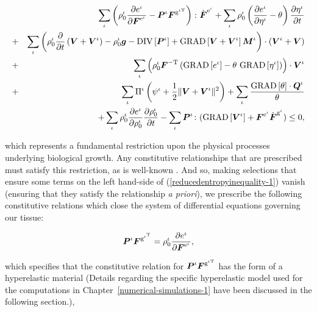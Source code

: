 \begin{eqnarray}
& &\sum\limits_{\iota}\left(\rho_{0}^{\iota}\frac{\partial
    e^\iota}{\partial\mbox{\boldmath$ F$}^{\mathrm{e}^\iota}} -
  \mbox{\boldmath$ P$}^\iota\mbox{\boldmath$ F$}^{\mathrm{g}^{\iota\mathrm{T}}}\right)
  \colon\dot{\mbox{\boldmath$ F$}}^{\mathrm{e}^\iota} +
  \sum\limits_{\iota}\rho_{0}^{\iota}\left(\frac{\partial
    e^\iota}{\partial
    \eta^\iota}-\theta\right)\frac{\partial\eta^\iota}{\partial
    t}\nonumber\\ &+&\sum\limits_{\iota}
  \left(\rho^\iota_0\frac{\partial}{\partial
    t}\left(\mbox{\boldmath$ V$}+\mbox{\boldmath$ V$}^\iota\right) - \rho_0^\iota\mbox{\boldmath$ g$} -
  \mathrm{DIV}\left[\mbox{\boldmath$ P$}^\iota\right] +
  \mathrm{GRAD}\left[\mbox{\boldmath$ V$}+\mbox{\boldmath$ V$}^\iota\right]\mbox{\boldmath$ M$}^\iota\right)
  \cdot(\mbox{\boldmath$ V$}^\iota+\mbox{\boldmath$ V$})\nonumber\\ &+&
  \sum\limits_{\iota}\left(\rho^\iota_0\mbox{\boldmath$ F$}^{-\mathrm{T}}  
  \left(\mathrm{GRAD}\left[e^\iota\right] -
    \theta\ \mathrm{GRAD}\left[\eta^\iota\right]\right)
    \right)\cdot\mbox{\boldmath$ V$}^\iota\nonumber\\  
    &+&\sum\limits_{\iota}\Pi^\iota\left(\psi^\iota
    + \frac{1}{2}\Vert\mbox{\boldmath$ V$}+\mbox{\boldmath$ V$}^\iota\Vert^2\right) +
    \sum\limits_{\iota} \frac{\mathrm{GRAD}\left[\theta\right]
      \cdot\mbox{\boldmath$ Q$}^\iota}{\theta}\nonumber\\  &  & + 
    \sum\limits_{\iota}\rho^\iota_0\frac{\partial
      e^\iota}{\partial\rho^\iota_0}\frac{\partial
      \rho^\iota_0}{\partial t} -
    \sum\limits_{\iota}\mbox{\boldmath$ P$}^\iota
    \colon(\mathrm{GRAD}\left[\mbox{\boldmath$ V$}^\iota\right] + 
    \mbox{\boldmath$ F$}^{\mathrm{e}^\iota}\dot{\mbox{\boldmath$ F$}}^{\mathrm{g}^\iota}) \leq 0,
\label{reducedentropyinequality-1}
\end{eqnarray}

\noindent which represents a fundamental restriction upon the physical
processes underlying biological growth. Any constitutive relationships
that are prescribed must satisfy this restriction, as is well-known
\citep{TruesdellToupin:60}. And so, making selections that ensure some
terms on the left hand-side of (\ref{reducedentropyinequality-1})
vanish (ensuring that they satisfy the relationship {\em a priori}),
we prescribe the following constitutive relations which close the
system of differential equations governing our tissue:

\begin{equation}
\mbox{\boldmath$ P$}^\iota\mbox{\boldmath$ F$}^{\mathrm{g}^{\iota^\mathrm{T}}} = \rho_0^\iota
\frac{\partial e^\iota}{\partial\mbox{\boldmath$ F$}^{\mathrm{e}^\iota}},
\label{constitutive-relation-hyperelasticity}
\end{equation}

\noindent which specifies that the constitutive relation for
$\mbox{\boldmath$ P$}^\iota\mbox{\boldmath$ F$}^{\mathrm{g}^{\iota\mathrm{T}}}$ has the form of a
hyperelastic material (Details regarding the specific hyperelastic
model used for the computations in
Chapter~\ref{numerical-simulations-1} have been discussed in the
following section.),

